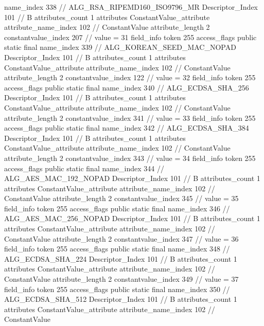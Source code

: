 {{{{{				name_index	338		// ALG_RSA_RIPEMD160_ISO9796_MR
				Descriptor_Index	101		// B
				attributes_count	1
				attributes {
				ConstantValue_attribute {
					attribute_name_index	102		// ConstantValue
					attribute_length	2
					constantvalue_index	207		// value = 31
				}
				}
			}
			field_info {
				token	255
				access_flags	public static final
				name_index	339		// ALG_KOREAN_SEED_MAC_NOPAD
				Descriptor_Index	101		// B
				attributes_count	1
				attributes {
				ConstantValue_attribute {
					attribute_name_index	102		// ConstantValue
					attribute_length	2
					constantvalue_index	122		// value = 32
				}
				}
			}
			field_info {
				token	255
				access_flags	public static final
				name_index	340		// ALG_ECDSA_SHA_256
				Descriptor_Index	101		// B
				attributes_count	1
				attributes {
				ConstantValue_attribute {
					attribute_name_index	102		// ConstantValue
					attribute_length	2
					constantvalue_index	341		// value = 33
				}
				}
			}
			field_info {
				token	255
				access_flags	public static final
				name_index	342		// ALG_ECDSA_SHA_384
				Descriptor_Index	101		// B
				attributes_count	1
				attributes {
				ConstantValue_attribute {
					attribute_name_index	102		// ConstantValue
					attribute_length	2
					constantvalue_index	343		// value = 34
				}
				}
			}
			field_info {
				token	255
				access_flags	public static final
				name_index	344		// ALG_AES_MAC_192_NOPAD
				Descriptor_Index	101		// B
				attributes_count	1
				attributes {
				ConstantValue_attribute {
					attribute_name_index	102		// ConstantValue
					attribute_length	2
					constantvalue_index	345		// value = 35
				}
				}
			}
			field_info {
				token	255
				access_flags	public static final
				name_index	346		// ALG_AES_MAC_256_NOPAD
				Descriptor_Index	101		// B
				attributes_count	1
				attributes {
				ConstantValue_attribute {
					attribute_name_index	102		// ConstantValue
					attribute_length	2
					constantvalue_index	347		// value = 36
				}
				}
			}
			field_info {
				token	255
				access_flags	public static final
				name_index	348		// ALG_ECDSA_SHA_224
				Descriptor_Index	101		// B
				attributes_count	1
				attributes {
				ConstantValue_attribute {
					attribute_name_index	102		// ConstantValue
					attribute_length	2
					constantvalue_index	349		// value = 37
				}
				}
			}
			field_info {
				token	255
				access_flags	public static final
				name_index	350		// ALG_ECDSA_SHA_512
				Descriptor_Index	101		// B
				attributes_count	1
				attributes {
				ConstantValue_attribute {
					attribute_name_index	102		// ConstantValue
}}}}}}}

